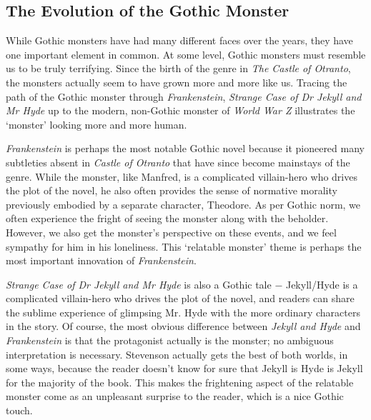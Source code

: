 \documentclass{article}
\begin{document}
\insertTitle

\subsection*{The Evolution of the Gothic Monster}
\begin{doublespace}
While Gothic monsters have had many different faces over the years, they have one important element in common. At some level, Gothic monsters must resemble us to be truly terrifying. Since the birth of the genre in \textit{The Castle of Otranto}, the monsters actually seem to have grown more and more like us. Tracing the path of the Gothic monster through \textit{Frankenstein}, \textit{Strange Case of Dr Jekyll and Mr Hyde} up to the modern, non-Gothic monster of \textit{World War Z} illustrates the `monster' looking more and more human.

\textit{Frankenstein} is perhaps the most notable Gothic novel because it pioneered many subtleties absent in \textit{Castle of Otranto} that have since become mainstays of the genre. While the monster, like Manfred, is a complicated villain-hero who drives the plot of the novel, he also often provides the sense of normative morality previously embodied by a separate character, Theodore. As per Gothic norm, we often experience the fright of seeing the monster along with the beholder. However, we also get the monster's perspective on these events, and we feel sympathy for him in his loneliness. This `relatable monster' theme is perhaps the most important innovation of \textit{Frankenstein}.

\textit{Strange Case of Dr Jekyll and Mr Hyde} is also a Gothic tale $-$ Jekyll/Hyde is a complicated villain-hero who drives the plot of the novel, and readers can share the sublime experience of glimpsing Mr. Hyde with the more ordinary characters in the story. Of course, the most obvious difference between \textit{Jekyll and Hyde} and \textit{Frankenstein} is that the protagonist actually is the monster; no ambiguous interpretation is necessary. Stevenson actually gets the best of both worlds, in some ways, because the reader doesn't know for sure that Jekyll is Hyde is Jekyll for the majority of the book. This makes the frightening aspect of the relatable monster come as an unpleasant surprise to the reader, which is a nice Gothic touch.


\end{doublespace}
\end{document}
